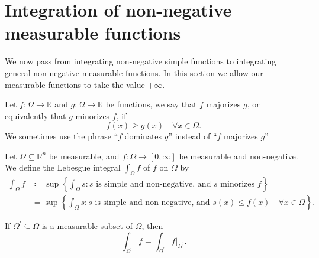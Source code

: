 \section{Integration of non-negative measurable functions}
We now pass from integrating non-negative simple functions to integrating general non-negative measurable functions. In this section we allow our measurable functions to take the value \(+\infty\).

\begin{definition}
    Let \(f: \Omega \to \mathbb{R} \) and \(g: \Omega \to \mathbb{R}\) be functions, we say that \(f\) majorizes \(g\), or equivalently that \(g\) minorizes \(f\), if
    \[
        f(x) \ge g(x) \quad \forall x \in \Omega.
    \]      
    We sometimes use the phrase “\(f\) dominates \(g\)” instead of “\(f\) majorizes \(g\)”
\end{definition}

\begin{definition}
    Let \(\Omega \subseteq \mathbb{R} ^n\) be measurable, and \(f: \Omega \to [0, \infty]\) be measurable and non-negative. We define the Lebesgue integral \(\int _\Omega f\) of \(f\) on \(\Omega \) by 
    \begin{align*}
        \int _\Omega f &\coloneqq \sup \left\{ \int _\Omega s: s \text{ is simple and non-negative, and } s \text{ minorizes } f   \right\} \\
        &= \sup \left\{ \int _\Omega s: s \text{ is simple and non-negative, and } s(x) \le f(x) \quad \forall x \in \Omega  \right\}. 
    \end{align*}   
\end{definition}

\begin{remark}
    If \(\Omega ^{\prime} \subseteq \Omega\) is a measurable subset of \(\Omega\), then 
    \[
        \int _{\Omega ^{\prime}} f = \int _{\Omega ^{\prime} } f\vert_{\Omega ^{\prime} }. 
    \]  
\end{remark}


